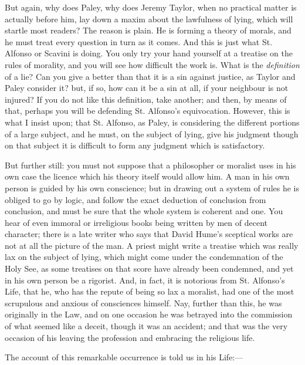 But again, why does Paley, why does Jeremy Taylor, when no practical
matter is actually before him, lay down a maxim about the
lawfulness of lying, which will startle most readers? The reason is
plain. He is forming a theory of morals, and he must treat every
question in turn as it comes. And this is just what St. Alfonso or
Scavini is doing. You only try your hand yourself at a treatise on the
rules of morality, and you will see how difficult the work is. What is
the \emph{definition} of a lie? Can you give a better than that it is a
sin against justice, as Taylor and Paley consider it? but, if so,
how can it be a sin at all, if your neighbour is not injured? If you do
not like this definition, take another; and then, by means of that,
perhaps you will be defending St. Alfonso's equivocation. However, this
is what I insist upon; that St. Alfonso, as Paley, is considering the
different portions of a large subject, and he must, on the subject of
lying, give his judgment though on that subject it is difficult to form
any judgment which is satisfactory.

But further still: you must not suppose that a philosopher or
moralist uses in his own case the licence which his theory itself would
allow him. A man in his own person is guided by his own conscience; but
in drawing out a system of rules he is obliged to go by logic, and
follow the exact deduction of conclusion from conclusion, and must be sure that the whole system is coherent and one. You hear
of even immoral or irreligious books being written by men of decent
character; there is a late writer who says that David Hume's sceptical
works are not at all the picture of the man. A priest might
write a treatise which was really lax on the
subject of lying, which might come under the condemnation of the Holy
See, as some treatises on that score have already been
condemned, and yet in his own person be a rigorist. And, in fact, it is
notorious from St. Alfonso's Life, that he, who has the repute of being
so lax a moralist, had one of the most scrupulous and anxious of
consciences himself. Nay, further than this, he was originally in the
Law, and on one occasion he was betrayed into the commission of what
seemed like a deceit, though it was an accident; and that was the very
occasion of his leaving the profession and embracing the religious life.

The account of this remarkable occurrence is told us in his Life:—

